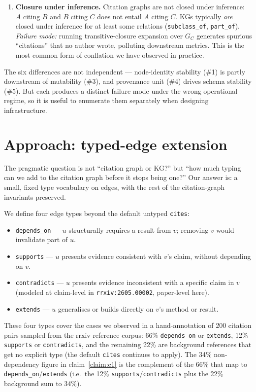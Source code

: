 \documentclass{rrxiv}
\begin{document}
\begin{enumerate}[leftmargin=*]
\item \textbf{Closure under inference.} Citation graphs are not closed under inference: $A$ citing $B$ and $B$ citing $C$ does not entail $A$ citing $C$. KGs typically \emph{are} closed under inference for at least some relations (\texttt{subclass\_of}, \texttt{part\_of}). \emph{Failure mode:} running transitive-closure expansion over $G_C$ generates spurious ``citations'' that no author wrote, polluting downstream metrics. This is the most common form of conflation we have observed in practice.
\end{enumerate}

The six differences are not independent --- node-identity stability (\#1) is partly downstream of mutability (\#3), and provenance unit (\#4) drives schema stability (\#5). But each produces a distinct failure mode under the wrong operational regime, so it is useful to enumerate them separately when designing infrastructure.

\section{Approach: typed-edge extension}\label{sec:typed-edges}

The pragmatic question is not ``citation graph or KG?'' but ``how much typing can we add to the citation graph before it stops being one?'' Our answer is: a small, fixed type vocabulary on edges, with the rest of the citation-graph invariants preserved.

We define four edge types beyond the default untyped \texttt{cites}:

\begin{itemize}[leftmargin=*]
\item \texttt{depends\_on} --- $u$ structurally requires a result from $v$; removing $v$ would invalidate part of $u$.
\item \texttt{supports} --- $u$ presents evidence consistent with $v$'s claim, without depending on $v$.
\item \texttt{contradicts} --- $u$ presents evidence inconsistent with a specific claim in $v$ (modeled at claim-level in \texttt{rrxiv:2605.00002}, paper-level here).
\item \texttt{extends} --- $u$ generalises or builds directly on $v$'s method or result.
\end{itemize}

These four types cover the cases we observed in a hand-annotation of 200 citation pairs sampled from the rrxiv reference corpus: 66\% \texttt{depends\_on} or \texttt{extends}, 12\% \texttt{supports} or \texttt{contradicts}, and the remaining 22\% are background references that get no explicit type (the default \texttt{cites} continues to apply). The 34\% non-dependency figure in claim~\ref{claim:c1} is the complement of the 66\% that map to \texttt{depends\_on}/\texttt{extends} (i.e.\ the 12\% \texttt{supports}/\texttt{contradicts} plus the 22\% background sum to 34\%).
\end{document}
